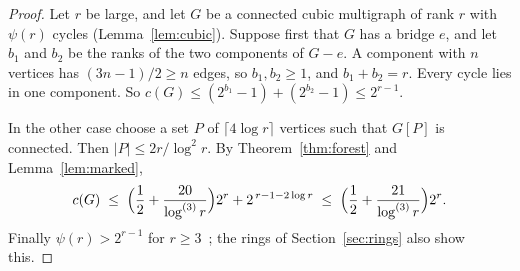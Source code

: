 \begin{proof}
Let $r$ be large, and let $G$ be a connected cubic multigraph of rank $r$ with $\psi(r)$ cycles
(Lemma~\ref{lem:cubic}). Suppose first that $G$ has a bridge $e$, and let $b_1$ and $b_2$ be the
ranks of the two components of $G-e$. A component with $n$ vertices has $(3n-1)/2\ge n$ edges, so
$b_1,b_2\ge1$, and $b_1+b_2=r$. Every cycle lies in one component. So
$c(G)\le(2^{b_1}-1)+(2^{b_2}-1)\le2^{r-1}$.

In the other case choose a set $P$ of $\lceil4\log r\rceil$ vertices such that $G[P]$ is
connected. Then $|P|\le2r/\log^{2}r$. By Theorem~\ref{thm:forest} and Lemma~\ref{lem:marked},
\[
  c(G)\;\le\;\Bigl(\frac12+\frac{20}{\log^{(3)}r}\Bigr)2^{r}+2^{\,r-1-2\log r}
  \;\le\;\Bigl(\frac12+\frac{21}{\log^{(3)}r}\Bigr)2^{r}.
\]
Finally $\psi(r)>2^{r-1}$ for $r\ge3$~\cite{ES}; the rings of Section~\ref{sec:rings} also show this.
\end{proof}
